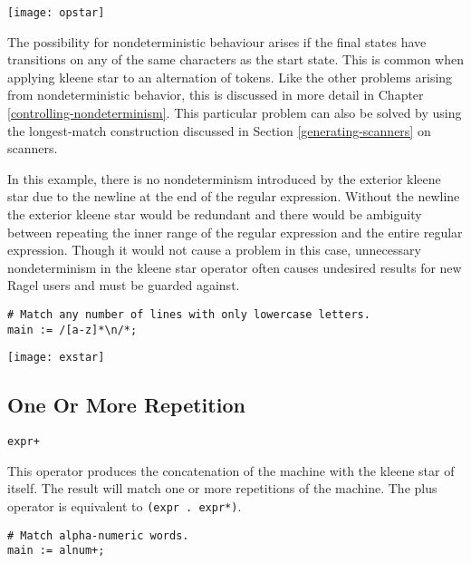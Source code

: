 \documentclass[letterpaper,11pt,oneside]{book}
\newcommand{\verbspace}{\vspace{10pt}}
\newcommand{\graphspace}{\vspace{10pt}}
\newenvironment{inline_code}{\def\baselinestretch{1}\vspace{12pt}\small}{}
\begin{document}
\graphspace
\begin{center}
\texttt{[image: opstar]}
\end{center}
\graphspace

The possibility for nondeterministic behaviour arises if the final states have
transitions on any of the same characters as the start state.  This is common
when applying kleene star to an alternation of tokens. Like the other problems
arising from nondeterministic behavior, this is discussed in more detail in Chapter
\ref{controlling-nondeterminism}. This particular problem can also be solved
by using the longest-match construction discussed in Section 
\ref{generating-scanners} on scanners.

In this 
example, there is no nondeterminism introduced by the exterior kleene star due to
the newline at the end of the regular expression. Without the newline the
exterior kleene star would be redundant and there would be ambiguity between
repeating the inner range of the regular expression and the entire regular
expression. Though it would not cause a problem in this case, unnecessary
nondeterminism in the kleene star operator often causes undesired results for
new Ragel users and must be guarded against.

\begin{inline_code}
\begin{verbatim}
# Match any number of lines with only lowercase letters.
main := /[a-z]*\n/*;
\end{verbatim}
\end{inline_code}
\verbspace
% }%%
% END GENERATE

\graphspace
\begin{center}
\texttt{[image: exstar]}
\end{center}
\graphspace

\subsection{One Or More Repetition}

\verb|expr+|

This operator produces the concatenation of the machine with the kleene star of
itself. The result will match one or more repetitions of the machine. The plus
operator is equivalent to \verb|(expr . expr*)|.  

\begin{inline_code}
\begin{verbatim}
# Match alpha-numeric words.
main := alnum+;
\end{verbatim}
\end{inline_code}
\verbspace
\end{document}
